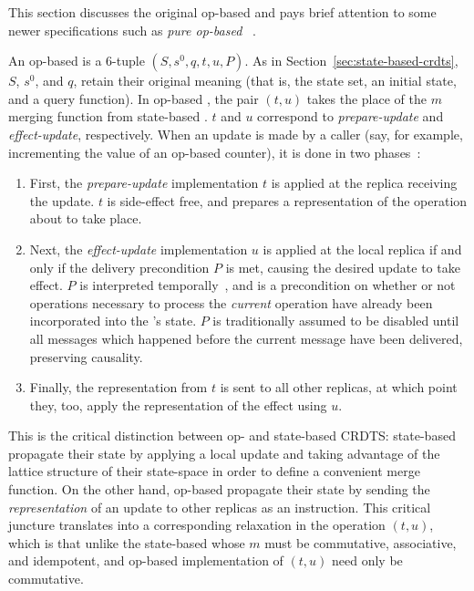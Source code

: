 This section discusses the original op-based \CRDTs and pays brief attention to
some newer specifications such as \textit{pure op-based \CRDTs}~\citep{shapiro11,
baquero17}.

An op-based \CRDT is a $6$-tuple $(S, s^0, q, t, u, P)$. As in
Section~\ref{sec:state-based-crdts}, $S$, $s^0$, and $q$, retain their
original meaning (that is, the state set, an initial state, and a query
function).  In op-based \CRDTs, the pair $(t,u)$ takes the place of the $m$
merging function from state-based \CRDTs. $t$ and $u$ correspond to
\textit{prepare-update} and \textit{effect-update}, respectively. When an update
is made by a caller (say, for example, incrementing the value of an op-based
\CRDT counter), it is done in two phases~\citep{shapiro11}:
\begin{enumerate}
  \item First, the \textit{prepare-update} implementation $t$ is applied at the
    replica receiving the update. $t$ is side-effect free, and prepares a
    representation of the operation about to take place.
  \item Next, the \textit{effect-update} implementation $u$ is applied at the
    local replica if and only if the delivery precondition $P$ is met, causing
    the desired update to take effect. $P$ is interpreted
    temporally~\citep{shapiro11}, and is a precondition on whether or not
    operations necessary to process the \emph{current} operation have already
    been incorporated into the \CRDT's state. $P$ is traditionally assumed to be
    disabled until all messages which happened before the current message have
    been delivered, preserving causality.
  \item Finally, the representation from $t$ is sent to all other replicas, at
    which point they, too, apply the representation of the effect using $u$.
\end{enumerate}

This is the critical distinction between op- and state-based CRDTS:
state-based \CRDTs propagate their state by applying a local update and taking
advantage of the lattice structure of their state-space in order to define a
convenient merge function. On the other hand, op-based \CRDTs propagate their
state by sending the \textit{representation} of an update to other replicas as
an instruction. This critical juncture translates into a corresponding
relaxation in the operation $(t, u)$, which is that unlike the state-based \CRDTs
whose $m$ must be commutative, associative, and idempotent, and op-based \CRDT
implementation of $(t, u)$ need only be commutative.


